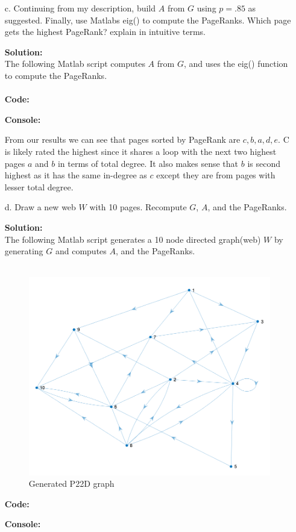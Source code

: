 \documentclass[12pt]{article}
\makeatletter
\theoremstyle{homework}
\newenvironment{exercise}[1]
{\def\@currentlabel{#1}\exercisecore}
{\endexercisecore}
\newcommand{\localhead}[1]{\par\smallskip\noindent\textbf{#1}\nobreak\\}%
\newcommand\solution{\localhead{Solution:}}
\makeatother
\begin{document}
\begin{exercise}{P22}
\begin{enumerate}
 \item[c.] Continuing from my description, build $A$ from $G$ using $p = .85$ as suggested. 
 Finally, use Matlabs eig() to compute the PageRanks. Which page gets the highest PageRank?
 explain in intuitive terms.\\
 \solution The following Matlab script computes $A$ from $G$, and uses the eig() function to compute the PageRanks.\\
 \\
 \textbf{Code:}
 \begin{center}
   
 \end{center} 
 \textbf{Console:}
 \begin{center}
   
 \end{center} 
 From our results we can see that pages sorted by PageRank are $c, b, a, d, e$. C is likely rated the highest since it shares a loop with 
 the next two highest pages $a$ and $b$ in terms of total degree. It also makes sense that $b$ is second highest as it has the same in-degree as 
 $c$ except they are from pages with lesser total degree.  
 \vspace{1in}


 \item[d.] Draw a new web $W$ with 10 pages. Recompute $G$, $A$, and the PageRanks.\\
 \solution The following Matlab script generates a 10 node directed graph(web) $W$ by generating $G$ and computes $A$, and 
 the PageRanks.\\
 \\
 \begin{figure}[H]
  \begin{center}
    \caption{Generated P22D graph}
     \includegraphics[width=.8\textwidth]{P22DGraph.png}
  \end{center}
\end{figure}
 \textbf{Code:}
 \begin{center}
   
 \end{center} 
 \textbf{Console:}
 \begin{center}
   
 \end{center} 



\end{enumerate}
\end{exercise}
\end{document}
